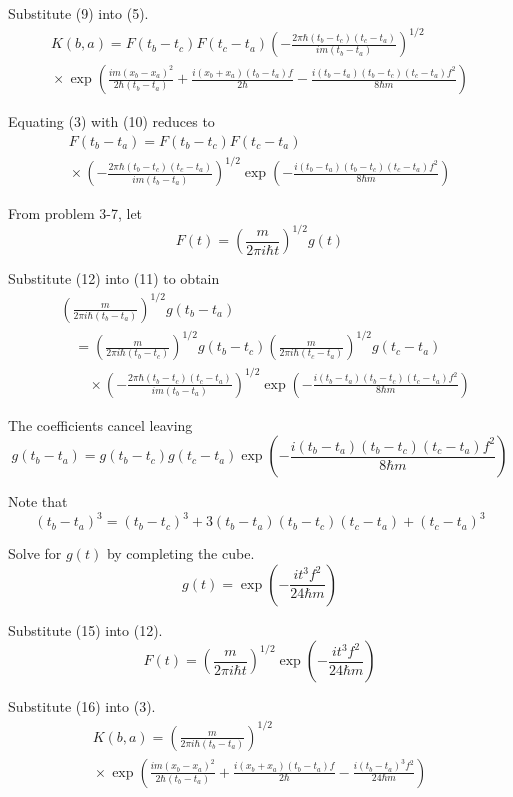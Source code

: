 \documentclass[12pt]{article}
\begin{document}
Substitute (9) into (5).
{\footnotesize
\begin{multline*}
K(b,a)=F(t_b-t_c)F(t_c-t_a)
\left(-\frac{2\pi\hbar(t_b-t_c)(t_c-t_a)}{im(t_b-t_a)}\right)^{1/2}
\\
{}\times \exp\left(
\frac{im(x_b-x_a)^2}{2\hbar(t_b-t_a)}
+\frac{i(x_b+x_a)(t_b-t_a)f}{2\hbar}
-\frac{i(t_b-t_a)(t_b-t_c)(t_c-t_a)f^2}{8\hbar m}
\right)
\tag{10}
\end{multline*}
}


Equating (3) with (10) reduces to
\begin{multline*}
F(t_b-t_a)=F(t_b-t_c)F(t_c-t_a)
\\
{}\times\left(-\frac{2\pi\hbar(t_b-t_c)(t_c-t_a)}{im(t_b-t_a)}\right)^{1/2}
\exp\left(-\frac{i(t_b-t_a)(t_b-t_c)(t_c-t_a)f^2}{8\hbar m}\right)
\tag{11}
\end{multline*}


From problem 3-7, let
\begin{equation*}
F(t)=\left(\frac{m}{2\pi i\hbar t}\right)^{1/2} g(t)
\tag{12}
\end{equation*}


Substitute (12) into (11) to obtain
\begin{align*}
&\left(\frac{m}{2\pi i\hbar(t_b-t_a)}\right)^{1/2} g(t_b-t_a)
\\
&\quad{}=\left(\frac{m}{2\pi i\hbar(t_b-t_c)}\right)^{1/2} g(t_b-t_c)
\left(\frac{m}{2\pi i\hbar(t_c-t_a)}\right)^{1/2} g(t_c-t_a)
\\
&\quad\quad{}\times\left(-\frac{2\pi\hbar(t_b-t_c)(t_c-t_a)}{im(t_b-t_a)}\right)^{1/2}
\exp\left(-\frac{i(t_b-t_a)(t_b-t_c)(t_c-t_a)f^2}{8\hbar m}\right)
\end{align*}


The coefficients cancel leaving
\begin{equation*}
g(t_b-t_a)=g(t_b-t_c)g(t_c-t_a)\exp\left(-\frac{i(t_b-t_a)(t_b-t_c)(t_c-t_a)f^2}{8\hbar m}\right)
\tag{13}
\end{equation*}


Note that
\begin{equation*}
(t_b-t_a)^3=
(t_b-t_c)^3
+3(t_b-t_a)(t_b-t_c)(t_c-t_a)
+(t_c-t_a)^3
\tag{14}
\end{equation*}


Solve for $g(t)$ by completing the cube.
\begin{equation*}
g(t)=\exp\left(-\frac{it^3f^2}{24\hbar m}\right)
\tag{15}
\end{equation*}


Substitute (15) into (12).
\begin{equation*}
F(t)=\left(\frac{m}{2\pi i\hbar t}\right)^{1/2} \exp\left(-\frac{it^3f^2}{24\hbar m}\right)
\tag{16}
\end{equation*}


Substitute (16) into (3).
\begin{multline*}
K(b,a)=\left(\frac{m}{2\pi i\hbar(t_b-t_a)}\right)^{1/2}
\\
{}\times\exp\left(
\frac{im(x_b-x_a)^2}{2\hbar(t_b-t_a)}
+\frac{i(x_b+x_a)(t_b-t_a)f}{2\hbar}
-\frac{i(t_b-t_a)^3f^2}{24\hbar m}
\right)
\end{multline*}
\end{document}

